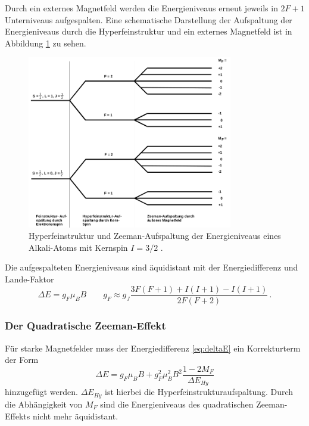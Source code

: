 Durch ein externes Magnetfeld werden die Energieniveaus erneut jeweils in $2F+1$ Unterniveaus aufgespalten.
Eine schematische Darstellung der Aufspaltung der Energieniveaus durch die Hyperfeinstruktur und ein externes Magnetfeld ist in Abbildung \ref{fig:tfig1} zu sehen.
\FloatBarrier
\begin{figure}[h]
    \centering
    \includegraphics[width=0.8\textwidth]{Hyperfeinstruktur.png}
    \caption{Hyperfeinstruktur und Zeeman-Aufspaltung der Energieniveaus eines Alkali-Atoms mit Kernspin $I=3/2$ \cite[4]{quelle01}.}
    \label{fig:tfig1}
\end{figure}
\FloatBarrier
\noindent
Die aufgespalteten Energieniveaus sind äquidistant mit der Energiedifferenz und Lande-Faktor
\begin{equation}
\Delta E = g_F \mu_B B \qquad g_F \approx g_J \frac{3 F(F+1)+I(I+1)- I(I+1)}{2F(F+2)}\, .
\end{equation}

\subsubsection*{Der Quadratische Zeeman-Effekt}
Für starke Magnetfelder muss der Energiedifferenz \eqref{eq:deltaE} ein Korrekturterm der Form
\begin{equation}
\Delta E = g_F \mu_B B + g_F^2 \mu_B^2 B^2 \frac{1-2M_F}{\Delta E_{Hy}}
\end{equation}
hinzugefügt werden.
$\Delta E_{Hy}$ ist hierbei die Hyperfeinstrukturaufspaltung.
Durch die Abhängigkeit von $M_F$ sind die Energieniveaus des quadratischen Zeeman-Effekts nicht mehr äquidistant.

